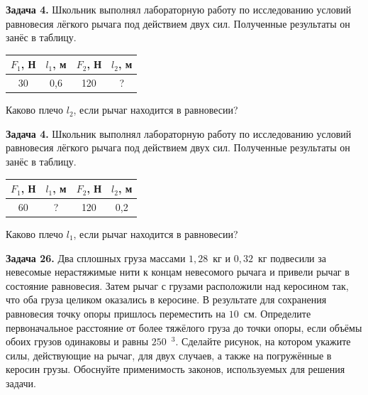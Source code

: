 
\begin{taskbasic}[code={\label{task:statics_v11_n04}}]
\textbf{Задача 4.} Школьник выполнял лабораторную работу по исследованию условий равновесия лёгкого рычага под действием двух сил. Полученные результаты он занёс в таблицу.

\begin{center}
\begin{tabular}{|c|c|c|c|}
\hline
$F_{1}$, Н & $l_{1}$, м & $F_{2}$, Н & $l_{2}$, м \\ \hline
30 & 0{,}6 & 120 & ? \\ \hline
\end{tabular}
\end{center}

Каково плечо $l_{2}$, если рычаг находится в равновесии?

\end{taskbasic}

\begin{taskbasic}[code={\label{task:statics_v12_n04}}]
\textbf{Задача 4.} Школьник выполнял лабораторную работу по исследованию условий равновесия лёгкого рычага под действием двух сил. Полученные результаты он занёс в таблицу.

\begin{center}
\begin{tabular}{|c|c|c|c|}
\hline
$F_{1}$, Н & $l_{1}$, м & $F_{2}$, Н & $l_{2}$, м \\ \hline
60 & ? & 120 & 0{,}2 \\ \hline
\end{tabular}
\end{center}

Каково плечо $l_{1}$, если рычаг находится в равновесии?

\end{taskbasic}

\begin{taskbasic}[code={\label{task:statics_v13_n26}}]
\textbf{Задача 26.} Два сплошных груза массами $1{,}28$~кг и $0{,}32$~кг подвесили за невесомые нерастяжимые нити к концам невесомого рычага и привели рычаг в состояние равновесия. Затем рычаг с грузами расположили над керосином так, что оба груза целиком оказались в керосине. В результате для сохранения равновесия точку опоры пришлось переместить на $10$~см. Определите первоначальное расстояние от более тяжёлого груза до точки опоры, если объёмы обоих грузов одинаковы и равны $250$~$^3$. Сделайте рисунок, на котором укажите силы, действующие на рычаг, для двух случаев, а также на погружённые в керосин грузы. Обоснуйте применимость законов, используемых для решения задачи.

\end{taskbasic}

